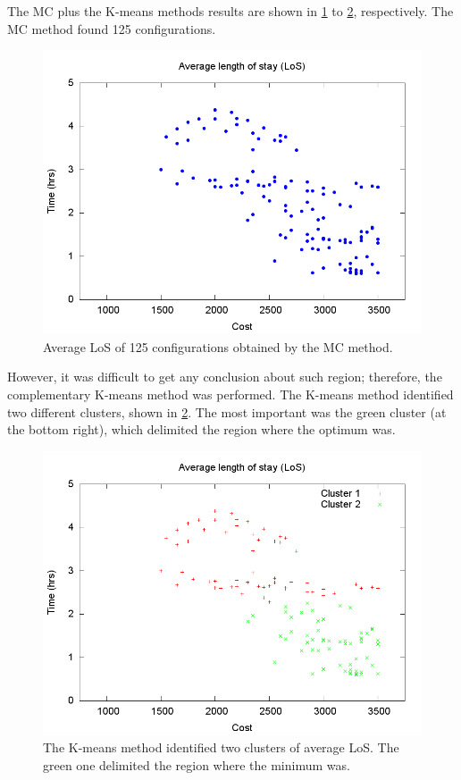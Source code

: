 \documentclass[11pt]{article} %
\begin{document}
The MC plus the K-means methods results are shown in \ref{subfig:mc8-1}
to \ref{subfig:km8-1}, respectively. The MC method found 125 configurations.
\begin{figure}[H]
\noindent \centering{}\includegraphics[width=0.95\columnwidth,height=0.25\paperheight]{figs4/v0/MC/MC-6400-602-50-69-25-125confs-LoS}\caption{Average LoS of 125 configurations obtained by the MC method. \label{subfig:mc8-1}}
\end{figure}
However, it was difficult to get any conclusion about such region;
therefore, the complementary K-means method was performed. The K-means
method identified two different clusters, shown in \ref{subfig:km8-1}.
The most important was the green cluster (at the bottom right), which
delimited the region where the optimum was.
\begin{figure}[H]
\noindent \centering{}\includegraphics[width=0.95\columnwidth,height=0.25\paperheight]{figs4/v0/MC/K-means-6400-602-50-69-25-125-Cluster1-58_Cluster2-58}\caption{The K-means method identified two clusters of average LoS. The green
one delimited the region where the minimum was.\label{subfig:km8-1}}
\end{figure}
\end{document}
